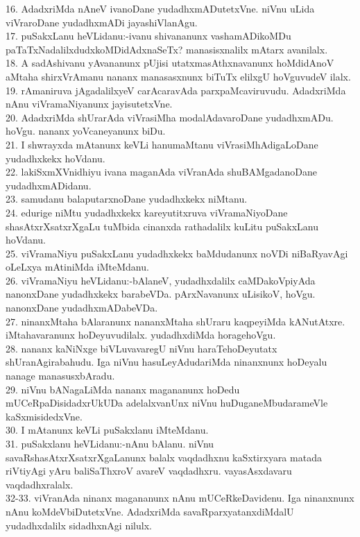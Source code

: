 \documentclass{article}
\begin{document}
16. AdadxriMda nAneV ivanoDane yudadhxmADutetxVne. niVnu uLida viVraroDane yudadhxmADi jayashiVlanAgu.\\
17. puSakxLanu heVLidanu:-ivanu shivananunx vashamADikoMDu paTaTxNadalilxdudxkoMDidAdxnaSeTx? manasisxnalilx mAtarx avanilalx.\\
18. A sadAshivanu yAvananunx pUjisi utatxmasAthxnavanunx hoMdidAnoV aMtaha shirxVrAmanu nananx manasasxnunx biTuTx elilxgU hoVguvudeV ilalx.\\
19. rAmaniruva jAgadalilxyeV carAcaravAda parxpaMcaviruvudu. AdadxriMda nAnu viVramaNiyanunx jayisutetxVne.\\
20. AdadxriMda shUrarAda viVrasiMha modalAdavaroDane yudadhxmADu. hoVgu. nananx yoVcaneyanunx biDu.\\
21. I shwrayxda mAtanunx keVLi hanumaMtanu viVrasiMhAdigaLoDane yudadhxkekx hoVdanu.\\
22. lakiSxmXVnidhiyu ivana maganAda viVranAda shuBAMgadanoDane yudadhxmADidanu.\\
23. samudanu balaputarxnoDane yudadhxkekx niMtanu.\\
24. edurige niMtu yudadhxkekx kareyutitxruva viVramaNiyoDane shasAtxrXsatxrXgaLu tuMbida cinanxda rathadalilx kuLitu puSakxLanu hoVdanu.\\
25. viVramaNiyu puSakxLanu yudadhxkekx baMdudanunx noVDi niBaRyavAgi oLeLxya mAtiniMda iMteMdanu.\\
26. viVramaNiyu heVLidanu:-bAlaneV, yudadhxdalilx caMDakoVpiyAda nanonxDane yudadhxkekx barabeVDa. pArxNavanunx uLisikoV, hoVgu. nanonxDane yudadhxmADabeVDa.\\
27. ninanxMtaha bAlaranunx nananxMtaha shUraru kaqpeyiMda kANutAtxre. iMtahavaranunx hoDeyuvudilalx. yudadhxdiMda horagehoVgu.\\
28. nananx kaNiNxge biVLuvavaregU niVnu haraTehoDeyutatx shUranAgirabahudu. Iga niVnu hasuLeyAdudariMda ninanxnunx hoDeyalu nanage manasusxbAradu.\\
29. niVnu bANagaLiMda nananx magananunx hoDedu mUCeRpaDisidadxrUkUDa adelalxvanUnx niVnu huDuganeMbudarameVle kaSxmisidedxVne.\\
30. I mAtanunx keVLi puSakxlanu iMteMdanu.\\
31. puSakxlanu heVLidanu:-nAnu bAlanu. niVnu savaRshasAtxrXsatxrXgaLanunx balalx vaqdadhxnu kaSxtirxyara matada riVtiyAgi yAru baliSaThxroV avareV vaqdadhxru. vayasAsxdavaru vaqdadhxralalx.\\
32-33. viVranAda ninanx magananunx nAnu mUCeRkeDavidenu. Iga ninanxnunx nAnu koMdeVbiDutetxVne. AdadxriMda savaRparxyatanxdiMdalU yudadhxdalilx sidadhxnAgi nilulx.\\
\end{document}
